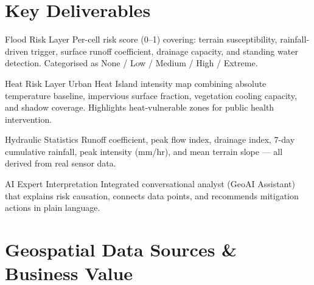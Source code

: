 \documentclass[11pt, a4paper]{article}
\begin{document}
\section{Key Deliverables}

\begin{minipage}[t]{0.48\linewidth}
\begin{kpibox}[accentdark]{Flood Risk Layer}
  Per-cell risk score (0–1) covering: terrain susceptibility, rainfall-driven trigger,
  surface runoff coefficient, drainage capacity, and standing water detection.
  Categorised as None / Low / Medium / High / Extreme.
\end{kpibox}
\end{minipage}\hfill
\begin{minipage}[t]{0.48\linewidth}
\begin{kpibox}[amber]{Heat Risk Layer}
  Urban Heat Island intensity map combining absolute temperature baseline, impervious
  surface fraction, vegetation cooling capacity, and shadow coverage.
  Highlights heat-vulnerable zones for public health intervention.
\end{kpibox}
\end{minipage}

\vspace{8pt}

\begin{minipage}[t]{0.48\linewidth}
\begin{kpibox}[emerald]{Hydraulic Statistics}
  Runoff coefficient, peak flow index, drainage index, 7-day cumulative rainfall,
  peak intensity (mm/hr), and mean terrain slope — all derived from real sensor data.
\end{kpibox}
\end{minipage}\hfill
\begin{minipage}[t]{0.48\linewidth}
\begin{kpibox}[danger]{AI Expert Interpretation}
  Integrated conversational analyst (GeoAI Assistant) that explains risk causation,
  connects data points, and recommends mitigation actions in plain language.
\end{kpibox}
\end{minipage}

\section{Geospatial Data Sources \& Business Value}
\end{document}
